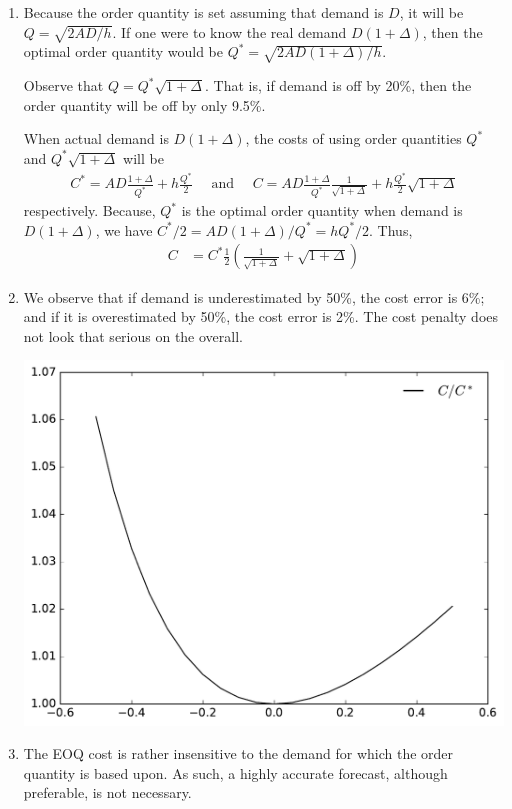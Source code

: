   \begin{solution}
\begin{enumerate}
\item Because the order quantity is set assuming that demand is $D$, it will be $Q=\sqrt{2AD/h}$. If one were to know the real demand $D(1+\Delta)$, then the optimal order quantity would be $Q^*=\sqrt{2AD(1+\Delta)/h}$. 

Observe that $Q=Q^*\sqrt{1+\Delta}$. That is, if demand is off by 20\%, then the order quantity will be off by only 9.5\%.

When actual demand is $D(1+\Delta)$, the costs of using order quantities $Q^*$ and $Q^*\sqrt{1+\Delta}$ will be 
\begin{align*}
C^* = AD\frac{1+\Delta}{Q^*}+ h\frac{Q^*}{2} \quad \text{ and } \quad C = AD\frac{1+\Delta}{Q^*}\frac{1}{\sqrt{1+\Delta}}+h\frac{Q^*}{2}\sqrt{1+\Delta}
\end{align*}
respectively. Because, $Q^*$ is the optimal order quantity when demand is $D(1+\Delta)$, we have $C^*/2=AD(1+\Delta)/Q^*=hQ^*/2$. Thus, 
\begin{align*}
C & = C^*\frac{1}{2}\left(\frac{1}{\sqrt{1+\Delta}}+\sqrt{1+\Delta}\right)
\end{align*}
\item We observe that if demand is underestimated by 50\%, the cost error is 6\%; and if it is overestimated by 50\%, the cost error is 2\%. The cost penalty does not look that serious on the overall.
\begin{center}
\includegraphics[width=.5\linewidth]{figures/Figure_1.pdf}
\end{center}
\item The EOQ cost is rather insensitive to the demand for which the order quantity is based upon. As such, a highly accurate forecast, although preferable, is not necessary. 
\end{enumerate}
    
  \end{solution}


